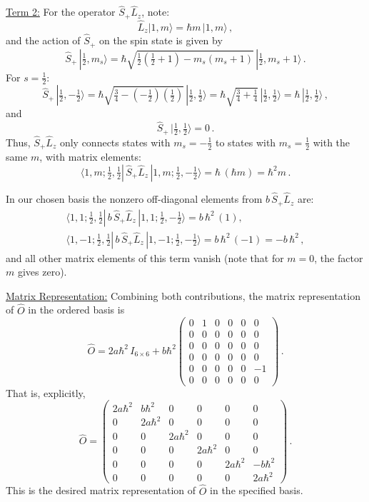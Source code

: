 \documentclass{article}
\begin{document}
\underline{Term 2:} For the operator \(\hat{S}_+\hat{L}_z\), note:
\[
\hat{L}_z|1,m\rangle = \hbar m\,|1,m\rangle\,,
\]
and the action of \(\hat{S}_+\) on the spin state is given by
\[
\hat{S}_+\,| \tfrac{1}{2}, m_s\rangle = \hbar \sqrt{\tfrac{1}{2}\left(\tfrac{1}{2}+1\right) - m_s(m_s+1)}\,|\tfrac{1}{2}, m_s+1\rangle\,.
\]
For \(s=\tfrac{1}{2}\):
\[
\hat{S}_+\,|\tfrac{1}{2}, -\tfrac{1}{2}\rangle = \hbar \sqrt{\tfrac{3}{4} - \left(-\tfrac{1}{2}\right)\left(\tfrac{1}{2}\right)}\,|\tfrac{1}{2}, \tfrac{1}{2}\rangle 
= \hbar \sqrt{\tfrac{3}{4}+\tfrac{1}{4}}\,|\tfrac{1}{2}, \tfrac{1}{2}\rangle 
= \hbar\,|\tfrac{1}{2}, \tfrac{1}{2}\rangle\,,
\]
and
\[
\hat{S}_+\,|\tfrac{1}{2}, \tfrac{1}{2}\rangle = 0\,.
\]
Thus, \(\hat{S}_+\hat{L}_z\) only connects states with \(m_s=-\tfrac{1}{2}\) to states with \(m_s=\tfrac{1}{2}\) with the same \(m\), with matrix elements:
\[
\langle 1,m; \tfrac{1}{2}, \tfrac{1}{2}|\,\hat{S}_+\hat{L}_z\,|1,m; \tfrac{1}{2}, -\tfrac{1}{2}\rangle = \hbar\,(\hbar m) = \hbar^2 m\,.
\]

In our chosen basis the nonzero off-diagonal elements from \(b\,\hat{S}_+\hat{L}_z\) are:
\[
\begin{array}{ll}
\langle 1,1; \tfrac{1}{2}, \tfrac{1}{2}|\,b\,\hat{S}_+\hat{L}_z\,|1,1; \tfrac{1}{2}, -\tfrac{1}{2}\rangle = b\,\hbar^2\,(1),\\[1mm]
\langle 1,-1; \tfrac{1}{2}, \tfrac{1}{2}|\,b\,\hat{S}_+\hat{L}_z\,|1,-1; \tfrac{1}{2}, -\tfrac{1}{2}\rangle = b\,\hbar^2\,(-1) = -b\,\hbar^2\,,
\end{array}
\]
and all other matrix elements of this term vanish (note that for \(m=0\), the factor \(m\) gives zero).

\underline{Matrix Representation:} Combining both contributions, the matrix representation of \(\hat{O}\) in the ordered basis is
\[
\hat{O} = 2a\hbar^2\,I_{6\times 6} + b\hbar^2
\begin{pmatrix}
0 & 1 & 0 & 0 & 0 & 0\\[1mm]
0 & 0 & 0 & 0 & 0 & 0\\[1mm]
0 & 0 & 0 & 0 & 0 & 0\\[1mm]
0 & 0 & 0 & 0 & 0 & 0\\[1mm]
0 & 0 & 0 & 0 & 0 & -1\\[1mm]
0 & 0 & 0 & 0 & 0 & 0
\end{pmatrix}\,.
\]
That is, explicitly,
\[
\hat{O} =
\begin{pmatrix}
2a\hbar^2 & b\hbar^2 & 0 & 0 & 0 & 0\\[1mm]
0 & 2a\hbar^2 & 0 & 0 & 0 & 0\\[1mm]
0 & 0 & 2a\hbar^2 & 0 & 0 & 0\\[1mm]
0 & 0 & 0 & 2a\hbar^2 & 0 & 0\\[1mm]
0 & 0 & 0 & 0 & 2a\hbar^2 & -b\hbar^2\\[1mm]
0 & 0 & 0 & 0 & 0 & 2a\hbar^2
\end{pmatrix}\,.
\]
This is the desired matrix representation of \(\hat{O}\) in the specified basis.
\end{document}
